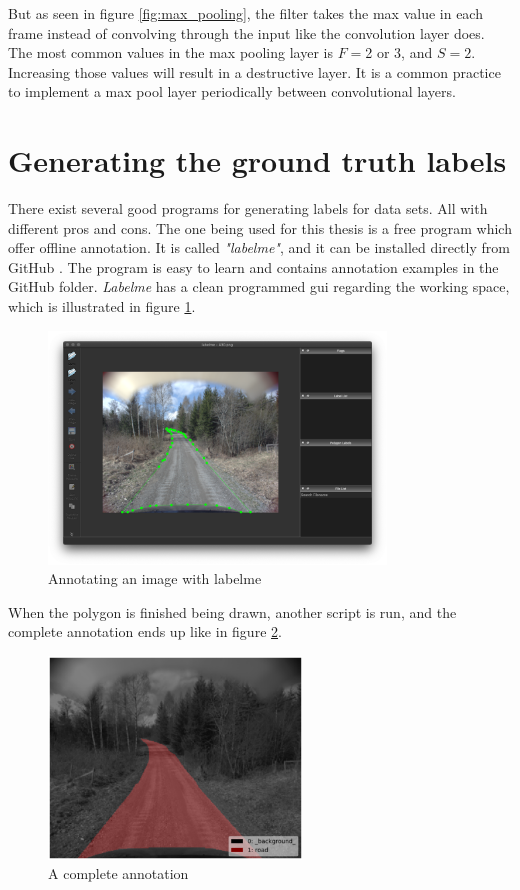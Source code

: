 \documentclass[USenglish]{ifimaster}  %
\begin{document}
But as seen in figure \ref{fig:max_pooling}, the filter takes the max value in each frame instead of convolving through the input like the convolution layer does. The most common values in the max pooling layer is $F=$2 or 3, and $S=2$. Increasing those values will result in a destructive layer. It is a common practice to implement a max pool layer periodically between convolutional layers.

\section{Generating the ground truth labels}
There exist several good programs for generating labels for data sets. All with different pros and cons. The one being used for this thesis is a free program which offer offline annotation. It is called \textit{"labelme"}, and it can be installed directly from GitHub \cite{website:labelme}. The program is easy to learn and contains annotation examples in the GitHub folder. \textit{Labelme} has a clean programmed \ac{gui} regarding the working space, which is illustrated in figure \ref{fig:annotate}. 

\begin{figure}[ht]
    \centering
    \includegraphics[width=0.8\textwidth]{bilder/annotating.png}
    \caption{Annotating an image with labelme}
    \label{fig:annotate}
\end{figure}

When the polygon is finished being drawn, another script is run, and the complete annotation ends up like in figure \ref{fig:finished_annotation}.  

\begin{figure}[ht]
    \centering
    \includegraphics[width=0.6\textwidth]{bilder/label_viz.png}
    \caption{A complete annotation}
    \label{fig:finished_annotation}
\end{figure}
\end{document}
